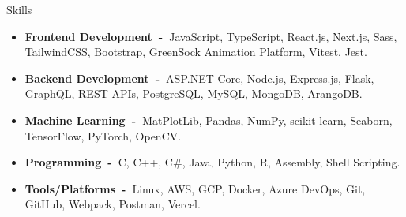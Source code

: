 \documentclass{resume}
\begin{document}
\begin{rSection}{Skills}
      \begin{itemize}[label=\null, leftmargin=*, parsep=0.5em]
            \item {
                  \textbf{Frontend Development~-~}JavaScript, TypeScript, React.js, Next.js, Sass, TailwindCSS, Bootstrap, GreenSock
                  Animation Platform, Vitest, Jest.
                  }
            \item {
                  \textbf{Backend Development~-~}ASP.NET Core, Node.js, Express.js, Flask, GraphQL, REST APIs, PostgreSQL, MySQL,
                  MongoDB, ArangoDB.\@
                  }
            \item {
                  \textbf{Machine Learning~-~}MatPlotLib, Pandas, NumPy, scikit-learn, Seaborn, TensorFlow, PyTorch, OpenCV.\@
                  }
            \item {
                  \textbf{Programming~-~}C, C++, C\#, Java, Python, R, Assembly, Shell Scripting.
                  }
            \item {
                  \textbf{Tools/Platforms~-~}Linux, AWS, GCP, Docker, Azure DevOps, Git, GitHub, Webpack, Postman, Vercel.
                  }
      \end{itemize}
\end{rSection}

\end{document}
